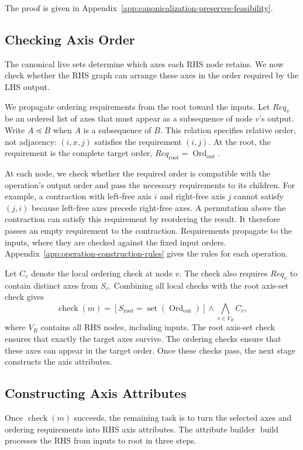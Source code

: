 The proof is given in Appendix~\ref{app:canonicalization-preserves-feasibility}.

\subsection{Checking Axis Order}
\label{sec:checking-axis-order}
The canonical live sets determine which axes each RHS node retains.
We now check whether the RHS graph can arrange these axes in the order
required by the LHS output.

We propagate ordering requirements from the root toward the inputs.
Let $Req_v$ be an ordered list of axes that must appear as a subsequence
of node $v$'s output. Write $A\preceq B$ when $A$ is a subsequence of $B$.
This relation specifies relative order, not adjacency: $(i,x,j)$
satisfies the requirement $(i,j)$.
At the root, the requirement is the complete target order,
$Req_{\mathrm{root}}=\operatorname{Ord}_{\mathrm{out}}$.

At each node, we check whether the required order is compatible with
the operation's output order and pass the necessary requirements to its
children. For example, a contraction with left-free axis $i$ and
right-free axis $j$ cannot satisfy $(j,i)$ because left-free axes precede
right-free axes. A permutation above the contraction can satisfy this
requirement by reordering the result. It therefore passes an empty
requirement to the contraction. Requirements propagate to the inputs,
where they are checked against the fixed input orders.
Appendix~\ref{app:operation-construction-rules} gives the rules for each
operation.

Let $C_v$ denote the local ordering check at node $v$.
The check also requires $Req_v$ to contain distinct axes from $S_v$.
Combining all local checks with the root axis-set check gives
\begin{equation}
 \operatorname{check}(m)
 =[S_{\mathrm{root}}=\operatorname{set}(\operatorname{Ord}_{\mathrm{out}})]
 \land\bigwedge_{v\in V_R}C_v,
\label{eq:feasibility}
\end{equation}
where $V_R$ contains all RHS nodes, including inputs.
The root axis-set check ensures that exactly the target axes survive.
The ordering checks ensure that these axes can appear in the target order.
Once these checks pass, the next stage constructs the axis attributes.

\subsection{Constructing Axis Attributes}
\label{sec:constructing-axis-attributes}
Once $\operatorname{check}(m)$ succeeds, the remaining task is to turn
the selected axes and ordering requirements into RHS axis attributes.
The attribute builder $\operatorname{build}$ processes the RHS from inputs to root
in three steps.

